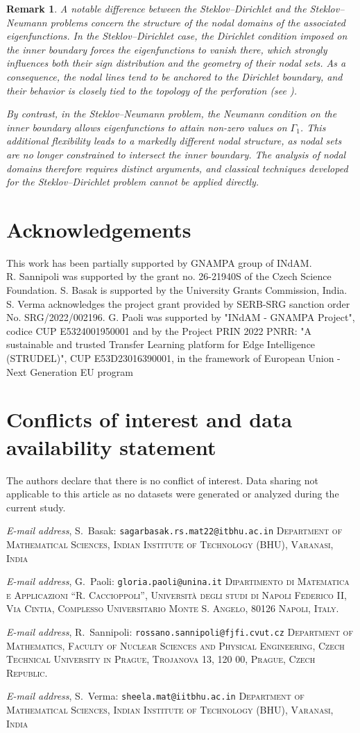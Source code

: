 \documentclass[12pt,reqno]{amsart}
\makeatletter
\newtheorem{remark}{Remark}[section]
\numberwithin{equation}{section}
\numberwithin{theorem}{section}
\numberwithin{equation}{section}
\numberwithin{theorem}{section}
\newcommand{\Addresses}{%
  \bigskip 
   \textit{E-mail address}, S.~Basak: \texttt{sagarbasak.rs.mat22@itbhu.ac.in}
   \medskip
\textsc{ Department of Mathematical Sciences, Indian Institute of Technology (BHU), Varanasi, India}
 
  \textit{E-mail address}, G.~Paoli: \texttt{gloria.paoli@unina.it} 
 \medskip
  \textsc{Dipartimento di Matematica e Applicazioni ``R. Caccioppoli'', Universit\`a degli studi di Napoli Federico II, Via Cintia, Complesso Universitario Monte S. Angelo, 80126 Napoli, Italy.}

  \textit{E-mail address}, R.~Sannipoli: \texttt{rossano.sannipoli@fjfi.cvut.cz} 
     \medskip 
\textsc{Department of Mathematics, Faculty of Nuclear Sciences and Physical Engineering, Czech Technical University in Prague, Trojanova 13, 120 00, Prague, Czech Republic.}

\textit{E-mail address}, S.~Verma: \texttt{sheela.mat@iitbhu.ac.in}
 \medskip
 \textsc{ Department of Mathematical Sciences, Indian Institute of Technology (BHU), Varanasi, India}\par\nopagebreak 

}
\makeatother
\begin{document}
\begin{remark}
A notable difference between the Steklov--Dirichlet and the
Steklov--Neumann problems concern the structure of the nodal domains of
the associated eigenfunctions. In the Steklov--Dirichlet case, the
Dirichlet condition imposed on the inner boundary forces the eigenfunctions
to vanish there, which strongly influences both their sign distribution
and the geometry of their nodal sets. As a consequence, the nodal lines
tend to be anchored to the Dirichlet boundary, and their behavior is
closely tied to the topology of the perforation (see \cite[Proposition 2.5]{sannipoli2025estimates}).

By contrast, in the Steklov--Neumann problem, the Neumann condition on the
inner boundary allows eigenfunctions to attain non-zero values on
$\Gamma_1$. This additional flexibility leads to a markedly different nodal
structure, as nodal sets are no longer constrained to intersect the inner
boundary. The analysis of nodal domains therefore requires distinct
arguments, and classical techniques developed for the Steklov--Dirichlet
problem cannot be applied directly.
\end{remark}

\section*{Acknowledgements}
This work has been partially supported by GNAMPA group of INdAM. \\R. Sannipoli was supported by the grant no. 26-21940S
of the Czech Science Foundation. S. Basak is supported by the University Grants Commission, India. S. Verma acknowledges the project grant provided by SERB-SRG sanction order No. SRG/2022/002196.
G. Paoli was supported by "INdAM - GNAMPA Project", codice CUP E5324001950001
    and  by the Project PRIN 2022 PNRR:  "A sustainable and trusted Transfer Learning platform for Edge Intelligence (STRUDEL)", CUP E53D23016390001, in the framework of European Union - Next Generation EU program

\section*{Conflicts of interest and data availability statement}
The authors declare that there is no conflict of interest. Data sharing not applicable to this article as no datasets were generated or analyzed during the current study.


\Addresses


\end{document}
